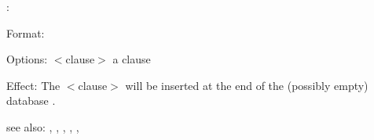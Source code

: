 \az:

Format: 

Options: $<$clause$>$ a \RELFUN{} clause

Effect: The $<$clause$>$ will be inserted at the end of the
        (possibly empty) \RELFUN{} database .

see also: \aNull, \azhn, \azft, \consult, \destroy, \replace
